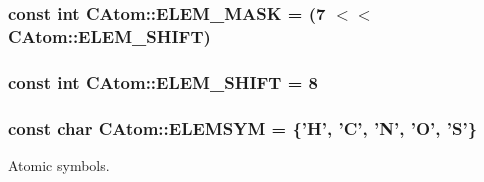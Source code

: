 \hypertarget{classCAtom_aa97b0aef40ff8616ad51269c3bd50070}{
\subsubsection[{E\-L\-E\-M\-\_\-\-M\-A\-S\-K}]{\setlength{\rightskip}{0pt plus 5cm}const int C\-Atom\-::\-E\-L\-E\-M\-\_\-\-M\-A\-S\-K = (7 $<$$<$ {\bf C\-Atom\-::\-E\-L\-E\-M\-\_\-\-S\-H\-I\-F\-T})\hspace{0.3cm}{\ttfamily [static]}}}\label{classCAtom_aa97b0aef40ff8616ad51269c3bd50070}
\hypertarget{classCAtom_a8d1a901dcaeab90596ffacac7bc04f3d}{
\subsubsection[{E\-L\-E\-M\-\_\-\-S\-H\-I\-F\-T}]{\setlength{\rightskip}{0pt plus 5cm}const int C\-Atom\-::\-E\-L\-E\-M\-\_\-\-S\-H\-I\-F\-T = 8\hspace{0.3cm}{\ttfamily [static]}}}\label{classCAtom_a8d1a901dcaeab90596ffacac7bc04f3d}
\hypertarget{classCAtom_a4c2f1a2299fb0ffbdb1307f744591baf}{
\subsubsection[{E\-L\-E\-M\-S\-Y\-M}]{\setlength{\rightskip}{0pt plus 5cm}const char C\-Atom\-::\-E\-L\-E\-M\-S\-Y\-M = \{'{\bf H}', '{\bf C}', '{\bf N}', '{\bf O}', '{\bf S}'\}\hspace{0.3cm}{\ttfamily [static]}}}\label{classCAtom_a4c2f1a2299fb0ffbdb1307f744591baf}


Atomic symbols. 

